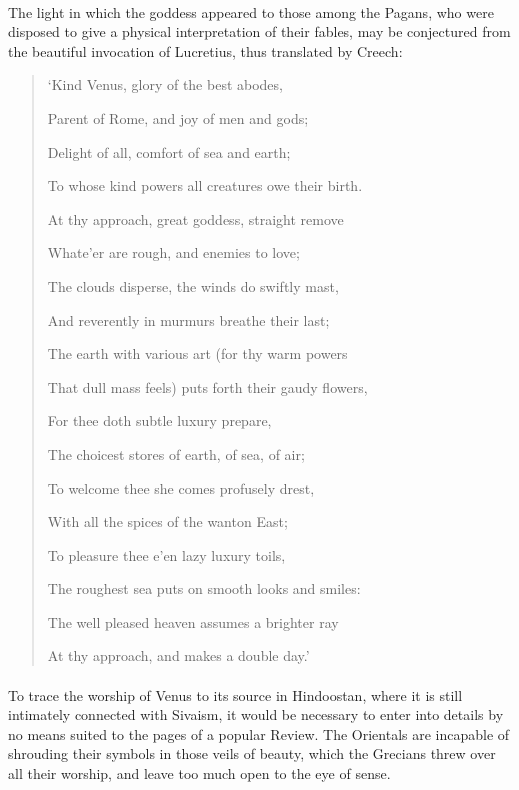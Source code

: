 \documentclass[a4paper, 11pt, oneside, polutonikogreek, english]{article}
\begin{document}
\paragraph{}
The light in which the goddess appeared to those among the Pagans, who were disposed to give a physical interpretation of their fables, may be conjectured from the beautiful invocation of Lucretius, thus translated by Creech:
\begin{quotation}\footnotesize
`Kind Venus, glory of the best abodes,

Parent of Rome, and joy of men and gods;

Delight of all, comfort of sea and earth;

To whose kind powers all creatures owe their birth.

At thy approach, great goddess, straight remove

Whate'er are rough, and enemies to love;

The clouds disperse, the winds do swiftly mast,

And reverently in murmurs breathe their last;

The earth with various art (for thy warm powers

That dull mass feels) puts forth their gaudy flowers,

For thee doth subtle luxury prepare,

The choicest stores of earth, of sea, of air;

To welcome thee she comes profusely drest,

With all the spices of the wanton East;

To pleasure thee e'en lazy luxury toils,

The roughest sea puts on smooth looks and smiles:

The well pleased heaven assumes a brighter ray

At thy approach, and makes a double day.'
\end{quotation}
\paragraph{}
To trace the worship of Venus to its source in Hindoostan, where it is still intimately connected with Sivaism, it would be necessary to enter into details by no means suited to the pages of a popular Review. The Orientals are incapable of shrouding their symbols in those veils of beauty, which the Grecians threw over all their worship, and leave too much open to the eye of sense.
\end{document}
